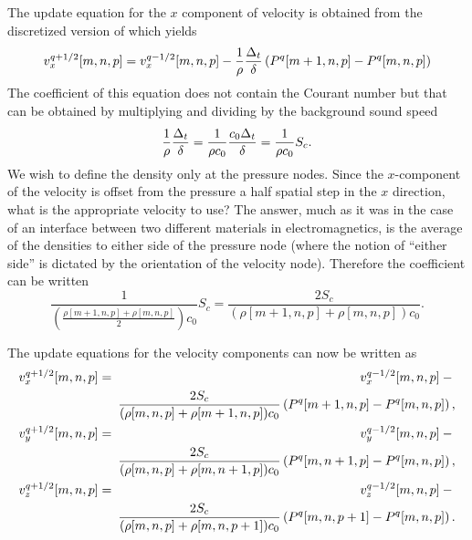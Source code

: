 The update equation for the $x$ component of velocity is obtained from
the discretized version of  which yields
\begin{equation}
v_x^{q+1/2}[m,n,p] = v_x^{q-1/2}[m,n,p]
               -\frac{1}{\rho}\frac{\Delta_t}{\delta}
                \left(P^q[m+1,n,p]-P^q[m,n,p]\right)
\end{equation}
The coefficient of this equation does not contain the Courant number
but that can be obtained by multiplying and dividing by the background
sound speed
\begin{equation}
  \frac{1}{\rho}\frac{\Delta_t}{\delta} = 
  \frac{1}{\rho c_0}\frac{c_0\Delta_t}{\delta} = 
  \frac{1}{\rho c_0} S_c.
\end{equation}
We wish to define the density only at the pressure nodes.  Since
the $x$-component of the velocity is offset from the pressure a half
spatial step in the $x$ direction, what is the appropriate velocity to
use?  The answer, much as it was in the case of an interface between
two different materials in electromagnetics, is the average of the
densities to either side of the pressure node (where the notion of
``either side'' is dictated by the orientation of the velocity node).
Therefore the coefficient can be written
\begin{equation}
  \frac{1}{\left(\frac{\rho[m+1,n,p]+\rho[m,n,p]}{2}\right) c_0} S_c =
  \frac{2 S_c}{(\rho[m+1,n,p]+\rho[m,n,p]) c_0}.
\end{equation}

The update equations for the velocity components can now be written as
\begin{eqnarray}
v_x^{q+1/2}[m,n,p] &=& v_x^{q-1/2}[m,n,p] - \mbox{} \nonumber\\
               &&\hspace{-5pt}\frac{2 S_c}{(\rho[m,n,p]+\rho[m+1,n,p]) c_0}
                \left(P^q[m+1,n,p]-P^q[m,n,p]\right), \\
v_y^{q+1/2}[m,n,p] &=& v_y^{q-1/2}[m,n,p] - \mbox{} \nonumber\\
               &&\hspace{-5pt}\frac{2 S_c}{(\rho[m,n,p]+\rho[m,n+1,p]) c_0}
                \left(P^q[m,n+1,p]-P^q[m,n,p]\right), \\
v_z^{q+1/2}[m,n,p] &=& v_z^{q-1/2}[m,n,p] - \mbox{} \nonumber\\
               &&\hspace{-5pt}\frac{2 S_c}{(\rho[m,n,p]+\rho[m,n,p+1]) c_0}
                \left(P^q[m,n,p+1]-P^q[m,n,p]\right).
\end{eqnarray}

